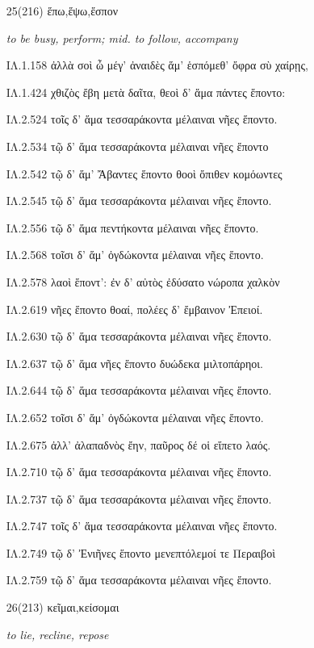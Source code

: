 \begin{enumerate}
\clearpage
\item[\large 25(216)]{\large \g ἕπω,ἕψω,ἕσπον   }

\hspace{0.2cm} \textit{to be busy, perform; mid. to follow, accompany  }

{\g
ΙΛ.1.158 ἀλλὰ σοὶ ὦ μέγ' ἀναιδὲς ἅμ' ἑσπόμεθ' ὄφρα σὺ χαίρῃς,

ΙΛ.1.424 χθιζὸς ἔβη μετὰ δαῖτα, θεοὶ δ' ἅμα πάντες ἕποντο:

ΙΛ.2.524 τοῖς δ' ἅμα τεσσαράκοντα μέλαιναι νῆες ἕποντο.

ΙΛ.2.534 τῷ δ' ἅμα τεσσαράκοντα μέλαιναι νῆες ἕποντο

ΙΛ.2.542 τῷ δ' ἅμ' Ἄβαντες ἕποντο θοοὶ ὄπιθεν κομόωντες

ΙΛ.2.545 τῷ δ' ἅμα τεσσαράκοντα μέλαιναι νῆες ἕποντο.

ΙΛ.2.556 τῷ δ' ἅμα πεντήκοντα μέλαιναι νῆες ἕποντο.

ΙΛ.2.568 τοῖσι δ' ἅμ' ὀγδώκοντα μέλαιναι νῆες ἕποντο.

ΙΛ.2.578 λαοὶ ἕποντ': ἐν δ' αὐτὸς ἐδύσατο νώροπα χαλκὸν

ΙΛ.2.619 νῆες ἕποντο θοαί, πολέες δ' ἔμβαινον Ἐπειοί.

ΙΛ.2.630 τῷ δ' ἅμα τεσσαράκοντα μέλαιναι νῆες ἕποντο.

ΙΛ.2.637 τῷ δ' ἅμα νῆες ἕποντο δυώδεκα μιλτοπάρηοι.

ΙΛ.2.644 τῷ δ' ἅμα τεσσαράκοντα μέλαιναι νῆες ἕποντο.

ΙΛ.2.652 τοῖσι δ' ἅμ' ὀγδώκοντα μέλαιναι νῆες ἕποντο.

ΙΛ.2.675 ἀλλ' ἀλαπαδνὸς ἔην, παῦρος δέ οἱ εἵπετο λαός.

ΙΛ.2.710 τῷ δ' ἅμα τεσσαράκοντα μέλαιναι νῆες ἕποντο.

ΙΛ.2.737 τῷ δ' ἅμα τεσσαράκοντα μέλαιναι νῆες ἕποντο.

ΙΛ.2.747 τοῖς δ' ἅμα τεσσαράκοντα μέλαιναι νῆες ἕποντο.

ΙΛ.2.749 τῷ δ' Ἐνιῆνες ἕποντο μενεπτόλεμοί τε Περαιβοὶ

ΙΛ.2.759 τῷ δ' ἅμα τεσσαράκοντα μέλαιναι νῆες ἕποντο.

}

\clearpage
\item[\large 26(213)]{\large \g   κεῖμαι,κείσομαι  }

\hspace{0.2cm} \textit{ to lie, recline, repose }


\end{enumerate}
